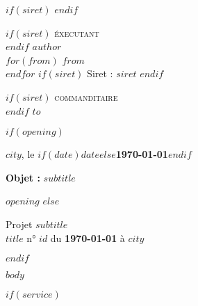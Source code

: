 \documentclass{/opt/class}
\begin{document}
$if(siret)$
  \logo
$endif$

\begin{multicols}{2}
  $if(siret)$
    {\small \textsc{éxecutant}}\\
  $endif$
  \textbf{$author$}\\
  $for(from)$
  $from$\\
  $endfor$
  $if(siret)$
    {\footnotesize Siret : $siret$}
  $endif$

  \begin{flushright}
    $if(siret)$
      {\small \textsc{commanditaire}}\\
    $endif$
    $to$
  \end{flushright}
\end{multicols}

$if(opening)$
  \begin{flushright}
    $city$, le \textbf{$if(date)$$date$$else$\today{}$endif$}\hspace*{72pt}
  \end{flushright}
  \vspace{2em}

  \textbf{Objet :} $subtitle$
  \vspace{2em}

  \setlength{\parindent}{24pt}
  $opening$
  \setlength{\parindent}{0pt}
  \vspace{1em}
$else$
  \hr

  Projet \textbf{$subtitle$}\\
  $title$ n° \textbf{$id$} du \textbf{\today{}} à $city$

  \hr
$endif$

$body$

$if(service)$
  \hr
  \STsetdecimalsep{,}
  \renewcommand\STprintnum[1]{\numprint{#1}}
\end{document}
